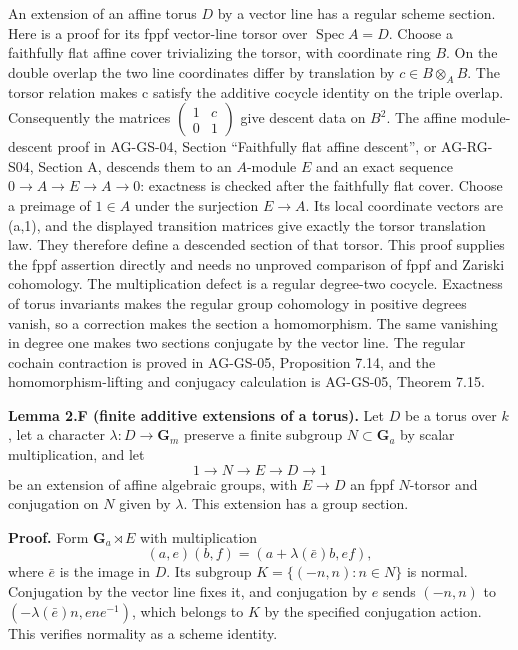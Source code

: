 \documentclass[11pt,a4paper,openany]{report}
\begin{document}
An extension of an affine torus \(D\) by a vector line has a regular scheme section. Here is a proof for its fppf vector-line torsor over \(\operatorname{Spec}A=D\). Choose a faithfully flat affine cover trivializing the torsor, with coordinate ring \(B\). On the double overlap the two line coordinates differ by translation by \(c\in B\otimes _A B\). The torsor relation makes c satisfy the additive cocycle identity on the triple overlap. Consequently the matrices \(\begin{pmatrix}1&c\\0&1\end{pmatrix}\) give descent data on \(B^2\). The affine module-descent proof in AG-GS-04, Section ``Faithfully flat affine descent'', or AG-RG-S04, Section A, descends them to an \(A\)-module \(E\) and an exact sequence \(0\to A\to E\to A\to0\): exactness is checked after the faithfully flat cover. Choose a preimage of \(1\in A\) under the surjection \(E\to A\). Its local coordinate vectors are (a,1), and the displayed transition matrices give exactly the torsor translation law. They therefore define a descended section of that torsor. This proof supplies the fppf assertion directly and needs no unproved comparison of fppf and Zariski cohomology. The multiplication defect is a regular degree-two cocycle. Exactness of torus invariants makes the regular group cohomology in positive degrees vanish, so a correction makes the section a homomorphism. The same vanishing in degree one makes two sections conjugate by the vector line. The regular cochain contraction is proved in AG-GS-05, Proposition 7.14, and the homomorphism-lifting and conjugacy calculation is AG-GS-05, Theorem 7.15.

\textbf{Lemma 2.F (finite additive extensions of a torus).} Let \(D\) be a torus over \(k\), let a character \(\lambda:D\to\mathbf G_m\) preserve a finite subgroup \(N\subset\mathbf G_a\) by scalar multiplication, and let \[
1\longrightarrow N\longrightarrow E\longrightarrow D\longrightarrow1
\] be an extension of affine algebraic groups, with \(E\to D\) an fppf \(N\)-torsor and conjugation on \(N\) given by \(\lambda\). This extension has a group section.

\textbf{Proof.} Form \(\mathbf G_a\rtimes E\) with multiplication \[
(a,e)(b,f)=(a+\lambda(\bar e)b,ef),
\] where \(\bar e\) is the image in \(D\). Its subgroup \(K=\{(-n,n):n\in N\}\) is normal. Conjugation by the vector line fixes it, and conjugation by \(e\) sends \((-n,n)\) to \((-\lambda(\bar e)n,ene^{-1})\), which belongs to \(K\) by the specified conjugation action. This verifies normality as a scheme identity.
\end{document}
